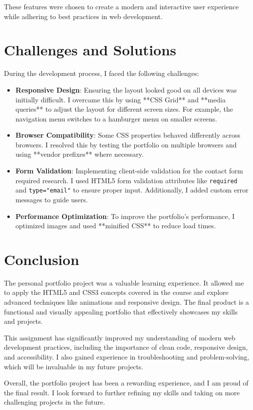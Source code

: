\documentclass[12pt]{article}
\begin{document}
These features were chosen to create a modern and interactive user experience while adhering to best practices in web development.

\section{\color{sectioncolor}Challenges and Solutions}
\label{sec:challenges}
During the development process, I faced the following challenges:
\begin{itemize}
    \item \textbf{Responsive Design}: Ensuring the layout looked good on all devices was initially difficult. I overcame this by using **CSS Grid** and **media queries** to adjust the layout for different screen sizes. For example, the navigation menu switches to a hamburger menu on smaller screens.
    \item \textbf{Browser Compatibility}: Some CSS properties behaved differently across browsers. I resolved this by testing the portfolio on multiple browsers and using **vendor prefixes** where necessary.
    \item \textbf{Form Validation}: Implementing client-side validation for the contact form required research. I used HTML5 form validation attributes like \texttt{required} and \texttt{type="email"} to ensure proper input. Additionally, I added custom error messages to guide users.
    \item \textbf{Performance Optimization}: To improve the portfolio's performance, I optimized images and used **minified CSS** to reduce load times.
\end{itemize}

\section{\color{sectioncolor}Conclusion}
\label{sec:conclusion}
The personal portfolio project was a valuable learning experience. It allowed me to apply the HTML5 and CSS3 concepts covered in the course and explore advanced techniques like animations and responsive design. The final product is a functional and visually appealing portfolio that effectively showcases my skills and projects.

This assignment has significantly improved my understanding of modern web development practices, including the importance of clean code, responsive design, and accessibility. I also gained experience in troubleshooting and problem-solving, which will be invaluable in my future projects.

Overall, the portfolio project has been a rewarding experience, and I am proud of the final result. I look forward to further refining my skills and taking on more challenging projects in the future.
\end{document}
